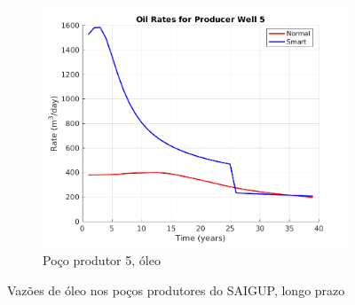 \begin{figure}[!ht]
	\begin{subfigure}[b]{.45\textwidth}
		\includegraphics[width=\textwidth]{figs/resultadosLSAIGUP/LSAIGUP_OilWell5_Zoom}
		\caption{Po\c{c}o produtor 5, \'{o}leo}
		\label{LSAIGUP_OilWell5}
	\end{subfigure}
	\caption{Vaz\~{o}es de \'{o}leo nos po\c{c}os produtores do SAIGUP, longo prazo}
	\label{LSAIGUP_OilRates}
\end{figure}


